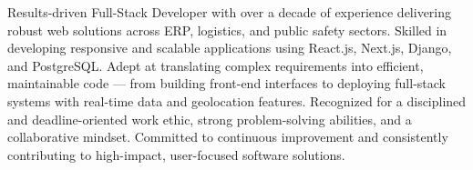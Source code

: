 
Results-driven Full-Stack Developer with over a decade of experience delivering robust web solutions across ERP, logistics, and public safety sectors. Skilled in developing responsive and scalable applications using React.js, Next.js, Django, and PostgreSQL. Adept at translating complex requirements into efficient, maintainable code — from building front-end interfaces to deploying full-stack systems with real-time data and geolocation features. Recognized for a disciplined and deadline-oriented work ethic, strong problem-solving abilities, and a collaborative mindset. Committed to continuous improvement and consistently contributing to high-impact, user-focused software solutions.